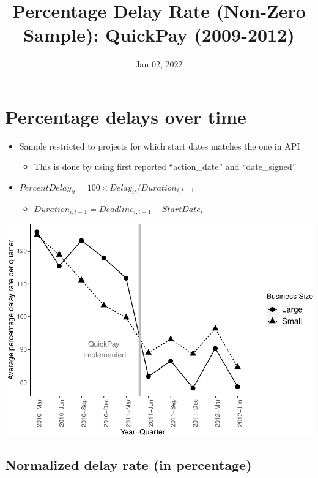 \documentclass[
]{article}
\title{Percentage Delay Rate (Non-Zero Sample): QuickPay (2009-2012)}
\author{}
\date{\vspace{-2.5em}Jan 02, 2022}
\providecommand{\tightlist}{%
  \setlength{\itemsep}{0pt}\setlength{\parskip}{0pt}}
\begin{document}
\maketitle

\hypertarget{percentage-delays-over-time}{%
\section{Percentage delays over
time}\label{percentage-delays-over-time}}

\begin{itemize}
\tightlist
\item
  Sample restricted to projects for which start dates matches the one in
  API

  \begin{itemize}
  \tightlist
  \item
    This is done by using first reported ``action\_date'' and
    ``date\_signed''
  \end{itemize}
\item
  \(PercentDelay_{it}=100 \times Delay_{it}/Duration_{i,t-1}\)

  \begin{itemize}
  \tightlist
  \item
    \(Duration_{i,t-1} = Deadline_{i,t-1} - StartDate_i\)
  \end{itemize}
\end{itemize}

\includegraphics{qp_first_pc_delay_non_zero_files/figure-latex/plot_pc_delay-1.pdf}

\hypertarget{normalized-delay-rate-in-percentage}{%
\subsection{Normalized delay rate (in
percentage)}\label{normalized-delay-rate-in-percentage}}
\end{document}
